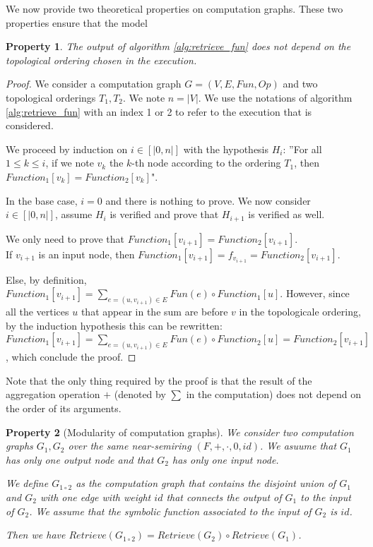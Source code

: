 \documentclass[11pt,a4paper]{article}
\newcommand{\Sum}[2]{\overset{#2}{\underset{#1}{\sum}}}
\newtheorem{property}{Property}
\theoremstyle{definition}
\renewcommand{\leq}{\leqslant}
\begin{document}
We now provide two theoretical properties on computation graphs. These two properties ensure that the model 

\begin{property}
	The output of algorithm \ref{alg:retrieve_fun} does not depend on the topological ordering chosen in the execution.
\end{property}

\begin{proof}

	We consider a computation graph $G = (V,E,Fun,Op)$ and two topological orderings $T_1 ,T_2$. We note $n = |V|$. We use the notations of algorithm \ref{alg:retrieve_fun} with an index 1 or 2 to refer to the execution that is considered.
	
	 We proceed by induction on $i \in [|0,n|]$ with the hypothesis $H_i$: ''For all $1 \leq k \leq i$, if we note $v_k$ the $k$-th node according to the ordering $T_1$, then $Function_1[v_k]=Function_2[v_k]$".
	 
	 In the base case, $i=0$ and there is nothing to prove. We now consider $i \in [|0,n|]$, assume $H_i$ is verified and prove that $H_{i+1}$ is verified as well.
	 
	 We only need to prove that $Function_1[v_{i+1}]=Function_2[v_{i+1}]$.\\
	 
	 If $v_{i+1}$ is an input node, then $Function_1[v_{i+1}]=f_{v_{i+1}}=Function_2[v_{i+1}]$.
	 
	 Else, by definition, $Function_1[v_{i+1}]=\Sum{e=(u,v_{i+1}) \in E}{} Fun(e) \circ Function_1[u]$. However, since all the vertices $u$ that appear in the sum are before $v$ in the topologicale ordering, by the induction hypothesis this can be rewritten: $Function_1[v_{i+1}]=\Sum{e=(u,v_{i+1}) \in E}{} Fun(e) \circ Function_2[u]=Function_2[v_{i+1}]$, which conclude the proof.
\end{proof}

Note that the only thing required by the proof is that the result of the aggregation operation $+$ (denoted by $\sum$ in the computation) does not depend on the order of its arguments.\\

\begin{property}[Modularity of computation graphs]
	We consider two computation graphs $G_1,G_2$ over the same near-semiring $(F,+,\cdot,0,id)$. We asuume that $G_1$ has only one output node and that $G_2$ has only one input node. 
	
	We define $G_{1 \circ 2}$ as the computation graph that contains the disjoint union of $G_1$ and $G_2$ with one edge with weight $id$ that connects the output of $G_1$ to the input of $G_2$. We assume that the symbolic function associated to the input of $G_2$ is $id$.
	
	Then we have $Retrieve(G_{1 \circ 2}) = Retrieve(G_2) \circ Retrieve(G_1)$.
\end{property}
\end{document}
